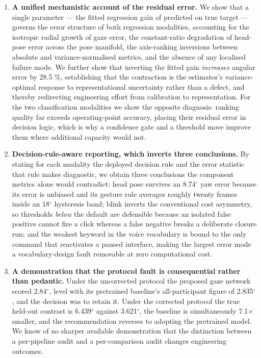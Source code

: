 \begin{enumerate}
\item \textbf{A unified mechanistic account of the residual error.} We show that a single parameter --- the fitted regression gain of predicted on true target --- governs the error structure of both regression modalities, accounting for the isotropic radial growth of gaze error, the constant-ratio degradation of head-pose error across the pose manifold, the axis-ranking inversions between absolute and variance-normalised metrics, and the absence of any localised failure mode. We further show that inverting the fitted gain \emph{increases} angular error by 28.5 \%, establishing that the contraction is the estimator's variance-optimal response to representational uncertainty rather than a defect, and thereby redirecting engineering effort from calibration to representation. For the two classification modalities we show the opposite diagnosis: ranking quality far exceeds operating-point accuracy, placing their residual error in decision logic, which is why a confidence gate and a threshold move improve them where additional capacity would not.

\item \textbf{Decision-rule-aware reporting, which inverts three conclusions.} By stating for each modality the deployed decision rule and the error statistic that rule makes diagnostic, we obtain three conclusions the component metrics alone would contradict: head pose survives an 8.74$^{\circ}$ yaw error because its error is unbiased and its gesture rule averages roughly twenty frames inside an 18$^{\circ}$ hysteresis band; blink inverts the conventional cost asymmetry, so thresholds \emph{below} the default are defensible because an isolated false positive cannot fire a click whereas a false negative breaks a deliberate closure run; and the weakest keyword in the voice vocabulary is bound to the only command that reactivates a paused interface, making the largest error mode a vocabulary-design fault removable at zero computational cost.

\item \textbf{A demonstration that the protocol fault is consequential rather than pedantic.} Under the uncorrected protocol the proposed gaze network scored 2.84$^{\circ}$, level with its pretrained baseline's all-participant figure of 2.835$^{\circ}$, and the decision was to retain it. Under the corrected protocol the true held-out contrast is 6.439$^{\circ}$ against 3.621$^{\circ}$, the baseline is simultaneously 7.1$\times$ smaller, and the recommendation reverses to adopting the pretrained model. We know of no sharper available demonstration that the distinction between a per-pipeline audit and a per-comparison audit changes engineering outcomes.
\end{enumerate}

